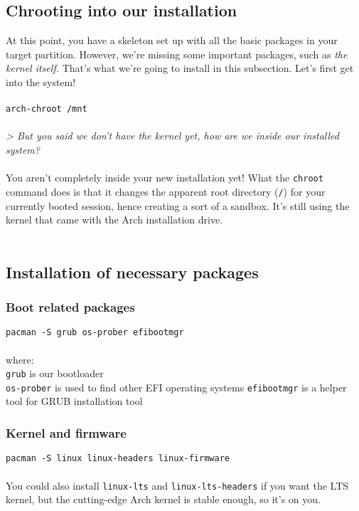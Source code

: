 \documentclass{article}
\begin{document}
\subsection{Chrooting into our installation}
At this point, you have a skeleton set up with all the basic packages in your target partition. However, we're missing some important packages, such as \textit{the kernel itself.} That's what we're going to install in this subsection. Let's first get into the system! 
\\\\
\texttt{arch-chroot /mnt}
\\\\
\textit{> But you said we don't have the kernel yet, how are we inside our installed system?}
\\\\
You aren't completely inside your new installation yet! What the \texttt{chroot} command does is that it changes the apparent root directory (\texttt{/}) for your currently booted session, hence creating a sort of a sandbox. It's still using the kernel that came with the Arch installation drive. 
\\\\

\subsection{Installation of necessary packages}
\subsubsection{Boot related packages}
\texttt{pacman -S grub os-prober efibootmgr}
\\\\
where:\\
\texttt{grub} is our bootloader\\
\texttt{os-prober} is used to find other EFI operating systems
\texttt{efibootmgr} is a helper tool for GRUB installation tool 

\subsubsection{Kernel and firmware}
\texttt{pacman -S linux linux-headers linux-firmware}\\\\
You could also install \texttt{linux-lts} and \texttt{linux-lts-headers} if you want the LTS kernel, but the cutting-edge Arch kernel is stable enough, so it's on you.
\end{document}
